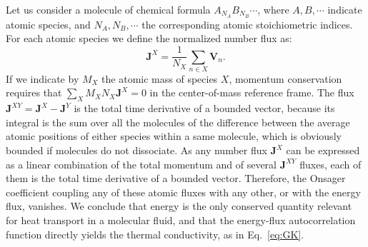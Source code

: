 Let us consider a molecule of chemical formula $A_{N_A} B_{N_B}\cdots$, where $A, B,\cdots$ indicate atomic species, and $N_A,N_B,\cdots$ the corresponding atomic stoichiometric indices. For each atomic species we define the normalized number flux as:
\begin{equation}
  \mathbf{J}^X = \frac{1}{N_X}\sum_{n\in X} \mathbf{V}_n. \label{eq:JX}
\end{equation}
If we indicate by $M_X$ the atomic mass of species $X$, momentum conservation requires that $\sum_X M_X N_X \mathbf{J}^X = 0$ in the center-of-mass reference frame. The flux $\mathbf{J}^{XY} = \mathbf{J}^{X}-\mathbf{J}^{Y}$ is the total time derivative of a bounded vector, because its integral is the sum over all the molecules of the difference between the average atomic positions of either species within a same molecule, which is obviously bounded if molecules do not dissociate. As any number flux $\mathbf{J}^X$ can be expressed as a linear combination of the total momentum and of several $\mathbf{J}^{XY}$ fluxes, each of them is the total time derivative of a bounded vector. Therefore, the Onsager coefficient coupling any of these atomic fluxes with any other, or with the energy flux, vanishes. We conclude that energy is the only conserved quantity relevant for heat transport in a molecular fluid, and that the energy-flux autocorrelation function directly yields the thermal conductivity, as in Eq.~\eqref{eq:GK}.

